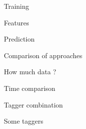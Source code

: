 \documentclass{beamer}
\begin{document}
\begin{frame}

\end{frame}

\begin{frame}{Training}


\end{frame}

\begin{frame}{Features}

\end{frame}

\begin{frame}{Prediction}

\end{frame}


\begin{frame}{Comparison of approaches}

\end{frame}



\begin{frame}{How much data ?}

\end{frame}

\begin{frame}{Time comparison}




\end{frame}


\begin{frame}{Tagger combination}



\end{frame}


\begin{frame}{Some taggers}




\end{frame}
\end{document}
